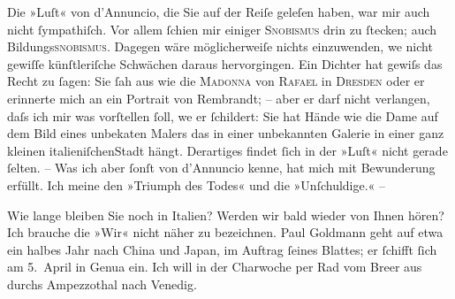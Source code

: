 \pstart
           Die »Luſt« von d’Annuncio, die Sie auf der Reiſe geleſen haben, war mir auch nicht
               ſympathiſch. Vor allem ſchien mir einiger \textsc{Snobismus}{ }{\pb}drin zu ſtecken; auch Bildungs\textsc{snobismus}. Dagegen wäre möglicherweiſe nichts einzuwenden,
                  we{\geminationn} nicht gewiſſe künſtleriſche Schwächen daraus
               hervorgingen. Ein Dichter hat gewiſs das Recht zu ſagen: Sie ſah aus wie die \textsc{Madonna} von \textsc{Rafael} in \textsc{Dresden} oder er erinnerte mich an ein Portrait von Rembrandt; – aber er darf nicht verlangen, daſs ich mir was vorſtellen ſoll,
                  we{\geminationn} er ſchildert: Sie hat Hände wie die {\pb}Dame auf dem Bild eines unbeka{\geminationn}ten Malers das in einer unbekannten Galerie in einer
               ganz kleinen italieniſchenStadt hängt. Derartiges findet ſich in der »Luſt« nicht gerade ſelten. – Was ich aber ſonſt
               von d’Annuncio kenne, hat mich mit Bewunderung
               erfüllt. Ich meine den »Triumph des Todes« und
               die »Unſchuldige.« –\pend
           
\pstart
           Wie lange bleiben Sie noch in Italien? Werden
               wir bald wieder von {\pb}Ihnen hören? Ich brauche die
               »Wir« nicht näher zu bezeichnen. Paul Goldmann
               geht auf etwa ein halbes Jahr nach China und Japan, im Auftrag ſeines Blattes; er ſchifft ſich am
                  5. April in Genua ein. Ich will
               in der Charwoche per Rad vom Bre{\geminationn}er aus durchs Ampezzothal
               nach Venedig.\pend
           
